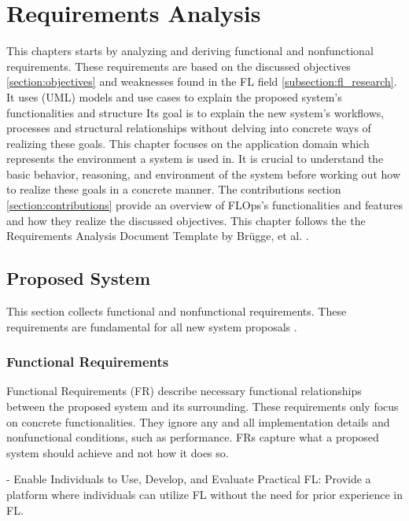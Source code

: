 \chapter{Requirements Analysis}

This chapters starts by analyzing and deriving functional and nonfunctional requirements.
These requirements are based on the discussed objectives \ref{section:objectives} and weaknesses found in the FL field \ref{subsection:fl_research}.
It uses (UML) models and use cases to explain the proposed system's functionalities and structure
Its goal is to explain the new system's workflows, processes and structural relationships without delving into concrete ways of realizing these goals.
This chapter focuses on the application domain which represents the environment a system is used in.
It is crucial to understand the basic behavior, reasoning, and environment of the system before working out how to realize these goals in a concrete manner.
The contributions section \ref{section:contributions} provide an overview of FLOps's functionalities and features and how they realize the discussed objectives.
This chapter follows the the Requirements Analysis Document Template by Brügge, et al. \cite{book:bruegge}.

\section{Proposed System}

This section collects functional and nonfunctional requirements.
These requirements are fundamental for all new system proposals \cite{book:bruegge}.

\subsection{Functional Requirements}
Functional Requirements (FR) describe necessary functional relationships between the proposed system and its surrounding.
These requirements only focus on concrete functionalities.
They ignore any and all implementation details and nonfunctional conditions, such as performance.
FRs capture what a proposed system should achieve and not how it does so. \cite{book:bruegge}




- Enable Individuals to Use, Develop, and Evaluate Practical FL:
    Provide a platform where individuals can utilize FL without the need for prior experience in FL.

